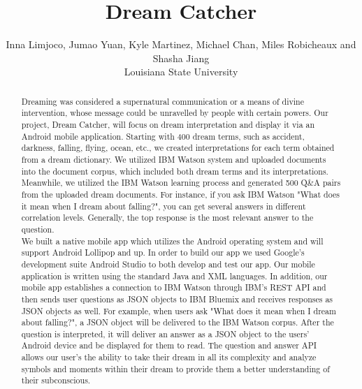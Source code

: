 \documentclass[twoside]{article}
\title{\vspace{-15mm}\fontsize{24pt}{14pt}\selectfont\textbf{Dream Catcher}} %
\author{
\small
{Inna Limjoco, Jumao Yuan, Kyle Martinez,  Michael Chan, Miles Robicheaux and Shasha Jiang}%
\\
\normalsize Louisiana State University \\ 
\vspace{-5mm}
}
\date{}
\begin{document}
\maketitle %

\thispagestyle{fancy} %


\begin{abstract}
{\selectfont

		Dreaming was considered a supernatural communication or a means of divine intervention, whose message could be unravelled by people with certain powers. Our project, Dream Catcher, will focus on dream interpretation and display it via an Android mobile application. Starting with 400 dream terms, such as accident, darkness, falling, flying, ocean, etc., we created interpretations for each term obtained from a dream dictionary. We utilized IBM Watson system and uploaded documents into the document corpus, which included both dream terms and its interpretations. Meanwhile, we utilized the IBM Watson learning process and generated 500 Q\&A pairs from the uploaded dream documents. For instance, if you ask IBM Watson "What does it mean when I dream about falling?", you can get several answers in different correlation levels. Generally, the top response is the most relevant answer to the question. \\

	We built a native mobile app which utilizes the Android operating system and will support Android Lollipop and up. In order to build our app we used Google's development suite Android Studio to both develop and test our app. Our mobile application is written using the standard  Java and XML languages. In addition, our mobile app establishes a connection to IBM Watson through IBM's REST API and then sends user questions as JSON objects to IBM Bluemix and receives responses as JSON objects as well. For example, when users ask "What does it mean when I dream about falling?",  a  JSON object will be delivered to the IBM Watson corpus. After the question is interpreted, it will deliver an answer as a JSON object to the users' Android device and be displayed for them to read. The question and answer API allows our user's the ability to take their dream in all its complexity and analyze symbols and moments within their dream to provide them a better understanding of their subconscious. \\

}
\end{abstract}
\end{document}
